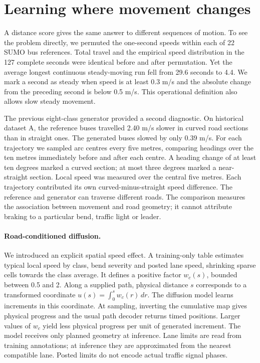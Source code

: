 \section{Learning where movement changes}
\label{sec:bend-feedback}
A distance score gives the same answer to different sequences of motion. To see the problem directly, we permuted the one-second speeds within each of 22 SUMO bus references. Total travel and the empirical speed distribution in the 127 complete seconds were identical before and after permutation. Yet the average longest continuous steady-moving run fell from 29.6 seconds to 4.4. We mark a second as steady when speed is at least 0.3 m/s and the absolute change from the preceding second is below 0.5 m/s. This operational definition also allows slow steady movement.

The previous eight-class generator provided a second diagnostic. On historical dataset A, the reference buses travelled 2.40 m/s slower in curved road sections than in straight ones. The generated buses slowed by only 0.39 m/s. For each trajectory we sampled arc centres every five metres, comparing headings over the ten metres immediately before and after each centre. A heading change of at least ten degrees marked a curved section; at most three degrees marked a near-straight section. Local speed was measured over the central five metres. Each trajectory contributed its own curved-minus-straight speed difference. The reference and generator can traverse different roads. The comparison measures the association between movement and road geometry; it cannot attribute braking to a particular bend, traffic light or leader.

\paragraph{Road-conditioned diffusion.}
We introduced an explicit spatial speed effect. A training-only table estimates typical local speed by class, bend severity and posted lane speed, shrinking sparse cells towards the class average. It defines a positive factor $w_c(s)$, bounded between 0.5 and 2. Along a supplied path, physical distance $s$ corresponds to a transformed coordinate $u(s)=\int_0^s w_c(r)\,dr$. The diffusion model learns increments in this coordinate. At sampling, inverting the cumulative map gives physical progress and the usual path decoder returns timed positions. Larger values of $w_c$ yield less physical progress per unit of generated increment. The model receives only planned geometry at inference. Lane limits are read from training annotations; at inference they are approximated from the nearest compatible lane. Posted limits do not encode actual traffic signal phases.

